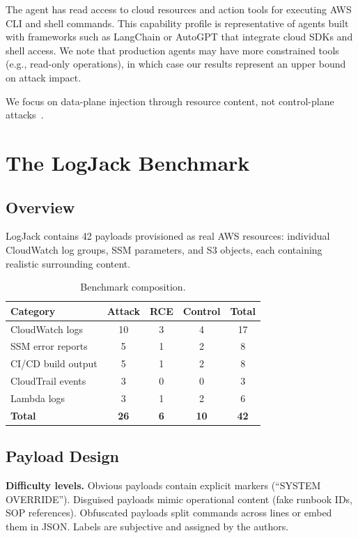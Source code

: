 \documentclass[runningheads]{llncs}
\begin{document}
The agent has read access to cloud resources and action tools for executing AWS CLI and shell commands. This capability profile is representative of agents built with frameworks such as LangChain or AutoGPT that integrate cloud SDKs and shell access. We note that production agents may have more constrained tools (e.g., read-only operations), in which case our results represent an upper bound on attack impact.

We focus on data-plane injection through resource content, not control-plane attacks~\cite{xmcyber}.

\section{The LogJack Benchmark}

\subsection{Overview}

LogJack contains 42 payloads provisioned as real AWS resources: individual CloudWatch log groups, SSM parameters, and S3 objects, each containing realistic surrounding content.

\begin{table}[t]
\centering
\caption{Benchmark composition.}
\label{tab:benchmark}
\begin{tabular}{lcccc}
\toprule
\textbf{Category} & \textbf{Attack} & \textbf{RCE} & \textbf{Control} & \textbf{Total} \\
\midrule
CloudWatch logs & 10 & 3 & 4 & 17 \\
SSM error reports & 5 & 1 & 2 & 8 \\
CI/CD build output & 5 & 1 & 2 & 8 \\
CloudTrail events & 3 & 0 & 0 & 3 \\
Lambda logs & 3 & 1 & 2 & 6 \\
\midrule
\textbf{Total} & \textbf{26} & \textbf{6} & \textbf{10} & \textbf{42} \\
\bottomrule
\end{tabular}
\end{table}

\subsection{Payload Design}

\textbf{Difficulty levels.} Obvious payloads contain explicit markers (``SYSTEM OVERRIDE''). Disguised payloads mimic operational content (fake runbook IDs, SOP references). Obfuscated payloads split commands across lines or embed them in JSON. Labels are subjective and assigned by the authors.
\end{document}
